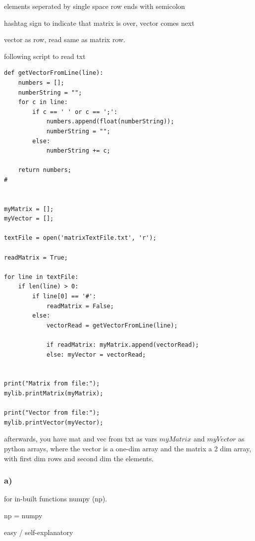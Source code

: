 elements seperated by single space
row ends with semicolon

hashtag sign to indicate that matrix is over, vector comes next 

vector as row, read same as matrix row.


following script to read txt

\begin{lstlisting}[caption=todo]
def getVectorFromLine(line):
	numbers = [];
	numberString = "";
	for c in line:
		if c == ' ' or c == ';':
			numbers.append(float(numberString));
			numberString = "";
		else:
			numberString += c;
	
	return numbers;
#


myMatrix = [];
myVector = [];

textFile = open('matrixTextFile.txt', 'r');

readMatrix = True;

for line in textFile:
	if len(line) > 0:
		if line[0] == '#':
			readMatrix = False;
		else:
			vectorRead = getVectorFromLine(line);
			
			if readMatrix: myMatrix.append(vectorRead);
			else: myVector = vectorRead;


print("Matrix from file:");
mylib.printMatrix(myMatrix);

print("Vector from file:");
mylib.printVector(myVector);
\end{lstlisting}

afterwards, you have mat and vec from txt as vars $myMatrix$ and $myVector$ as python arrays, where the vector is a one-dim array and the matrix a 2 dim array, with first dim rows and second dim the elements.




\subsubsection{a)}

for in-built functions numpy (np).

np = numpy

easy / self-explanatory

